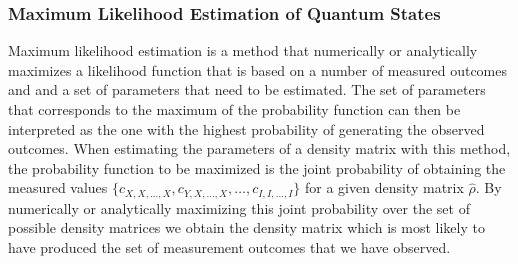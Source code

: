 \subsubsection{Maximum Likelihood Estimation of Quantum States}

Maximum likelihood estimation is a method that numerically or analytically maximizes a likelihood function that is based on a number of measured outcomes and and a set of parameters that need to be estimated. The set of parameters that corresponds to the maximum of the probability function can then be interpreted as the one with the highest probability of generating the observed outcomes. When estimating the parameters of a density matrix with this method, the probability function to be maximized is the joint probability of obtaining the measured values $\{c_{X,X,\hdots,X},c_{Y,X,\hdots,X},\hdots,c_{I,I,\hdots,I}\}$ for a given density matrix $\hat{\rho}$. By numerically or analytically maximizing this joint probability over the set of possible density matrices we obtain the density matrix which is most likely to have produced the set of measurement outcomes that we have observed.

